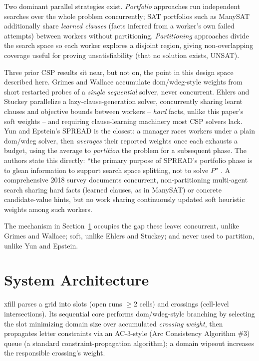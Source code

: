 \documentclass[conference]{IEEEtran}
\begin{document}
Two dominant parallel strategies exist. \textit{Portfolio} approaches run independent searches over the whole problem concurrently; SAT portfolios such as ManySAT \cite{hamadi2009} additionally share \textit{learned clauses} (facts inferred from a worker's own failed attempts) between workers without partitioning. \textit{Partitioning} approaches divide the search space so each worker explores a disjoint region, giving non-overlapping coverage useful for proving unsatisfiability (that no solution exists, UNSAT).

\IEEEpubidadjcol
Three prior CSP results sit near, but not on, the point in this design space described here. Grimes and Wallace \cite{grimes2007} accumulate dom/wdeg-style weights from short restarted probes of a \textit{single sequential} solver, never concurrent. Ehlers and Stuckey \cite{ehlers2016} parallelize a lazy-clause-generation solver, concurrently sharing learnt clauses and objective bounds between workers -- \textit{hard} facts, unlike this paper's soft weights -- and requiring clause-learning machinery most CSP solvers lack. Yun and Epstein's SPREAD \cite{yun2012hybrid} is the closest: a manager races workers under a plain dom/wdeg solver, then \textit{averages} their reported weights once each exhausts a budget, using the average to \textit{partition} the problem for a subsequent phase. The authors state this directly: ``the primary purpose of SPREAD's portfolio phase is to glean information to support search space splitting, not to solve $P$'' \cite{yun2012hybrid}. A comprehensive 2018 survey \cite{gent2018} documents concurrent, non-partitioning multi-agent search sharing hard facts (learned clauses, as in ManySAT) or concrete candidate-value hints, but no work sharing continuously updated soft heuristic weights among such workers.

The mechanism in Section~\ref{sec:arch} occupies the gap these leave: concurrent, unlike Grimes and Wallace; soft, unlike Ehlers and Stuckey; and never used to partition, unlike Yun and Epstein.

\section{System Architecture}
\label{sec:arch}

xfill parses a grid into slots (open runs $\geq 2$ cells) and crossings (cell-level intersections). Its sequential core performs dom/wdeg-style branching by selecting the slot minimizing domain size over accumulated \textit{crossing weight}, then propagates letter constraints via an AC-3-style (Arc Consistency Algorithm \#3) queue (a standard constraint-propagation algorithm); a domain wipeout increases the responsible crossing's weight.
\end{document}
